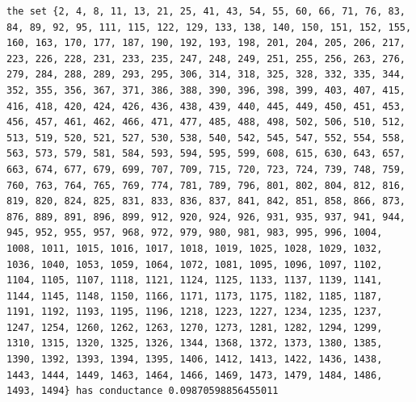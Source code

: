 \documentclass[12pt]{article}
\begin{document}
\begin{enumerate}[leftmargin=\labelsep, label=(\alph*)]
\begin{lstlisting}
the set {2, 4, 8, 11, 13, 21, 25, 41, 43, 54, 55, 60, 66, 71, 76, 83, 84, 89, 92, 95, 111, 115, 122, 129, 133, 138, 140, 150, 151, 152, 155, 160, 163, 170, 177, 187, 190, 192, 193, 198, 201, 204, 205, 206, 217, 223, 226, 228, 231, 233, 235, 247, 248, 249, 251, 255, 256, 263, 276, 279, 284, 288, 289, 293, 295, 306, 314, 318, 325, 328, 332, 335, 344, 352, 355, 356, 367, 371, 386, 388, 390, 396, 398, 399, 403, 407, 415, 416, 418, 420, 424, 426, 436, 438, 439, 440, 445, 449, 450, 451, 453, 456, 457, 461, 462, 466, 471, 477, 485, 488, 498, 502, 506, 510, 512, 513, 519, 520, 521, 527, 530, 538, 540, 542, 545, 547, 552, 554, 558, 563, 573, 579, 581, 584, 593, 594, 595, 599, 608, 615, 630, 643, 657, 663, 674, 677, 679, 699, 707, 709, 715, 720, 723, 724, 739, 748, 759, 760, 763, 764, 765, 769, 774, 781, 789, 796, 801, 802, 804, 812, 816, 819, 820, 824, 825, 831, 833, 836, 837, 841, 842, 851, 858, 866, 873, 876, 889, 891, 896, 899, 912, 920, 924, 926, 931, 935, 937, 941, 944, 945, 952, 955, 957, 968, 972, 979, 980, 981, 983, 995, 996, 1004, 1008, 1011, 1015, 1016, 1017, 1018, 1019, 1025, 1028, 1029, 1032, 1036, 1040, 1053, 1059, 1064, 1072, 1081, 1095, 1096, 1097, 1102, 1104, 1105, 1107, 1118, 1121, 1124, 1125, 1133, 1137, 1139, 1141, 1144, 1145, 1148, 1150, 1166, 1171, 1173, 1175, 1182, 1185, 1187, 1191, 1192, 1193, 1195, 1196, 1218, 1223, 1227, 1234, 1235, 1237, 1247, 1254, 1260, 1262, 1263, 1270, 1273, 1281, 1282, 1294, 1299, 1310, 1315, 1320, 1325, 1326, 1344, 1368, 1372, 1373, 1380, 1385, 1390, 1392, 1393, 1394, 1395, 1406, 1412, 1413, 1422, 1436, 1438, 1443, 1444, 1449, 1463, 1464, 1466, 1469, 1473, 1479, 1484, 1486, 1493, 1494} has conductance 0.09870598856455011


\end{lstlisting}
\end{enumerate}
\end{document}
